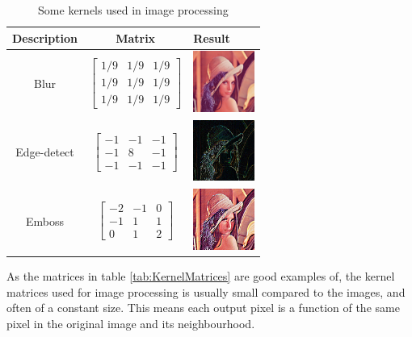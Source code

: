 \begin{table}
    \begin{tabular}{ccm{2cm}}
    Description & Matrix & Result \\
    \hline
    Blur & $
            \begin{bmatrix}
            1/9 & 1/9 & 1/9 \\
            1/9 & 1/9 & 1/9 \\
            1/9 & 1/9 & 1/9
            \end{bmatrix}
        $ & \includegraphics[width=2cm]{img/LenaBlurred} \\
    Edge-detect & $
            \begin{bmatrix}
            -1 & -1 & -1 \\
            -1 & 8 & -1 \\
            -1 & -1 & -1
            \end{bmatrix}
        $ & \includegraphics[width=2cm]{img/LenaEdge} \\
    Emboss & $
            \begin{bmatrix}
            -2 & -1 & 0 \\
            -1 & 1 & 1 \\
            0 & 1 & 2
            \end{bmatrix}
        $ & \includegraphics[width=2cm]{img/LenaEmbossed}
    \end{tabular}
    \caption{Some kernels used in image processing}
    \label{fig:KernelMatrices}
\end{table}

As the matrices in table \ref{tab:KernelMatrices} are good examples of, the kernel matrices used for image processing is usually small compared to the images, and often of a constant size.
This means each output pixel is a function of the same pixel in the original image and its neighbourhood.

